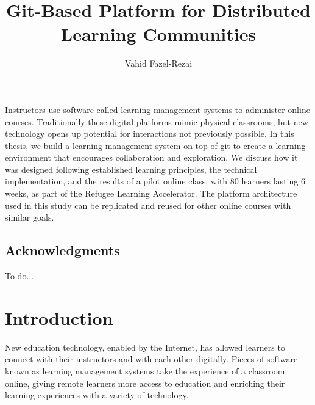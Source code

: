 \documentclass[12pt,twoside,vi]{mitthesis}
\newcommand{\wip}[1]{{\color{red} To do...}}
\begin{document}
\title{Git-Based Platform for Distributed Learning Communities}
\author{Vahid Fazel-Rezai}
\maketitle
\cleardoublepage
\setcounter{savepage}{\thepage}
\begin{abstractpage}
Instructors use software called learning management systems to administer online courses. Traditionally these digital platforms mimic physical classrooms, but new technology opens up potential for interactions not previously possible. In this thesis, we build a learning management system on top of git to create a learning environment that encourages collaboration and exploration. We discuss how it was designed following established learning principles, the technical implementation, and the results of a pilot online class, with 80 learners lasting 6 weeks, as part of the Refugee Learning Accelerator. The platform architecture used in this study can be replicated and reused for other online courses with similar goals.
\end{abstractpage}
\cleardoublepage
\section*{Acknowledgments}
\wip{Acknowledgments...}

\tableofcontents

\newpage
\listoffigures

\newpage
\listoftables

\chapter{Introduction}

New education technology, enabled by the Internet, has allowed learners to connect with their instructors and with each other digitally. Pieces of software known as learning management systems take the experience of a classroom online, giving remote learners more access to education and enriching their learning experiences with a variety of technology.
\end{document}
